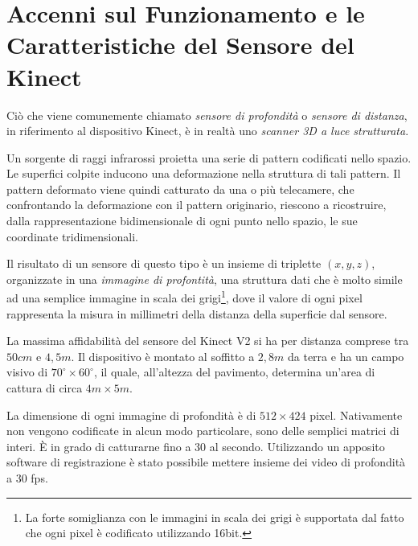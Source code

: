 
\chapter{Accenni sul Funzionamento e le Caratteristiche del Sensore del Kinect} %
\label{chap:kinect}

Ciò che viene comunemente chiamato \emph{sensore di profondità} o \emph{sensore di distanza}, in riferimento al dispositivo Kinect, è in realtà uno \emph{scanner 3D a luce strutturata}.

Un sorgente di raggi infrarossi proietta una serie di pattern codificati nello spazio.
Le superfici colpite inducono una deformazione nella struttura di tali pattern.
Il pattern deformato viene quindi catturato da una o più telecamere, che confrontando la deformazione con il pattern originario, riescono a ricostruire, dalla rappresentazione bidimensionale di ogni punto nello spazio, le sue coordinate tridimensionali.

Il risultato di un sensore di questo tipo è un insieme di triplette $(x,y,z)$, organizzate in una \emph{immagine di profontità}, una struttura dati che è molto simile ad una semplice immagine in scala dei grigi\footnote{La forte somiglianza con le immagini in scala dei grigi è supportata dal fatto che ogni pixel è codificato utilizzando 16bit.}, dove il valore di ogni pixel rappresenta la misura in millimetri della distanza della superficie dal sensore.

La massima affidabilità del sensore del Kinect V2 si ha per distanza comprese tra $50cm$ e $4,5m$.
Il dispositivo è montato al soffitto a $2,8m$ da terra e ha un campo visivo di $70^{\circ} \times 60^{\circ}$, il quale, all'altezza del pavimento, determina un'area di cattura di circa $4m \times 5m$.

La dimensione di ogni immagine di profondità è di $512 \times 424$ pixel. 
Nativamente non vengono codificate in alcun modo particolare, sono delle semplici matrici di interi.
È in grado di catturarne fino a 30 al secondo. 
Utilizzando un apposito software di registrazione è stato possibile mettere insieme dei video di profondità a 30 fps.

